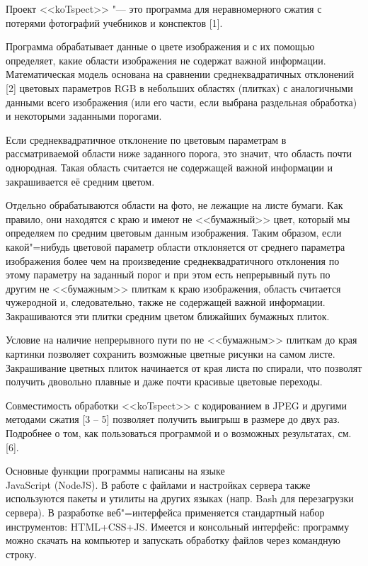 



\vzmscaption

Проект <<koTspect>> "--- это программа для неравномерного сжатия с потерями фотографий учебников и конспектов [1].

Программа обрабатывает данные о цвете изображения и с их помощью определяет, какие области изображения
не содержат важной информации. Математическая модель основана на сравнении среднеквадратичных отклонений [2]
цветовых параметров RGB в небольших областях (плитках) с аналогичными данными всего изображения (или его части, если выбрана
раздельная обработка) и некоторыми заданными порогами.

Если среднеквадратичное отклонение по цветовым параметрам в рассматриваемой области ниже заданного порога,
это значит, что область почти однородная. Такая область считается не содержащей важной информации и закрашивается её
средним цветом.

Отдельно обрабатываются области на фото, не лежащие на листе бумаги. Как правило, они находятся с краю и имеют
не <<бумажный>> цвет, который мы определяем по средним цветовым данным изображения. Таким образом, если какой"=нибудь
цветовой параметр области отклоняется от среднего параметра изображения более чем на произведение среднеквадратичного
отклонения по этому параметру на заданный порог и при этом есть непрерывный путь по другим не <<бумажным>> плиткам к
краю изображения, область считается чужеродной и, следовательно, также не содержащей важной информации. Закрашиваются
эти плитки средним цветом ближайших бумажных плиток.

Условие на наличие непрерывного пути по не <<бумажным>> плиткам до края картинки позволяет сохранить возможные цветные
рисунки на самом листе. Закрашивание цветных плиток начинается от края листа по спирали, что позволят получить
двовольно плавные и даже почти красивые цветовые переходы.

Совместимость обработки <<koTspect>> с кодированием в JPEG и другими методами сжатия [3 -- 5] позволяет получить выигрыш в размере
до двух раз. Подробнее о том, как пользоваться программой и о возможных результатах, см. [6].

Основные функции программы написаны на языке\\JavaScript (NodeJS). В работе с файлами и настройках сервера также используются
пакеты и утилиты на других языках (напр. Bash для перезагрузки сервера). В разработке веб"=интерфейса применяется стандартный
набор инструментов: HTML+CSS+JS.
Имеется и консольный интерфейс: программу можно скачать на компьютер и запускать обработку файлов через командную строку.

